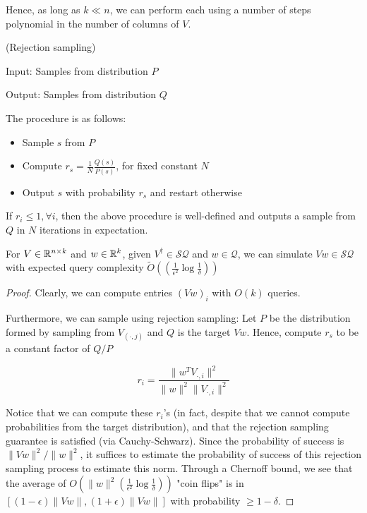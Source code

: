 \documentclass[main.tex]{subfiles}
\begin{document}
Hence, as long as $k \ll n$, we can perform  each using a number of steps polynomial in the number of columns of $V$. 

\begin{algorithm}(Rejection sampling)

Input: Samples from distribution $P$

Output: Samples from distribution $Q$

The procedure is as follows:

\begin{itemize}
\item Sample $s$ from $P$
\item Compute $r_s = \frac{1}{N}\frac{Q(s)}{P(s)}$, for fixed constant $N$
\item Output $s$ with probability $r_s$ and restart otherwise
\end{itemize}
\end{algorithm}

\begin{fact}
If $r_i \leq 1, \forall i$, then the above procedure is well-defined and outputs a sample from $Q$ in $N$ iterations in expectation.	
\end{fact}


\begin{proposition}
	 For $V \in \mathbb{R}^{n\times k}$ and $w \in \mathbb{R}^k$, given $V^\dag \in \mathcal{SQ}$ and $w \in \mathcal{Q}$, we can simulate $Vw \in \mathcal{SQ}$ with expected query complexity $\tilde{O}((\frac{1}{\epsilon^2}\log\frac{1}{\delta}))$

\begin{proof}
Clearly, we can compute entries $(Vw)_i$ with $O(k)$ queries.

Furthermore, we can sample using rejection sampling: Let $P$ be the distribution formed by sampling from $V_{(\cdot, j)}$ and $Q$ is the target $Vw$. Hence, compute $r_s$ to be a constant factor of $Q / P$

$$r_i = \frac{\|w^T V_{\cdot, i}\|^2}{\|w\|^2\|V_{\cdot, i}\|^2}$$

Notice that we can compute these $r_i$'s (in fact, despite that we cannot compute probabilities from the target distribution), and that the rejection sampling guarantee is satisfied (via Cauchy-Schwarz). Since the probability of success is $\|Vw\|^2/ \| w\|^2$, it suffices to estimate the probability of success of this rejection sampling process to estimate this norm. Through a Chernoff bound, we see that the average of $O(\|w\|^2(\frac{1}{\epsilon^2}\log\frac{1}{\delta}))$ "coin flips" is in $[(1-\epsilon)\|Vw\|,(1+\epsilon)\|Vw\|]$ with probability $\geq 1-\delta$.
\end{proof}
\end{proposition}
\end{document}
